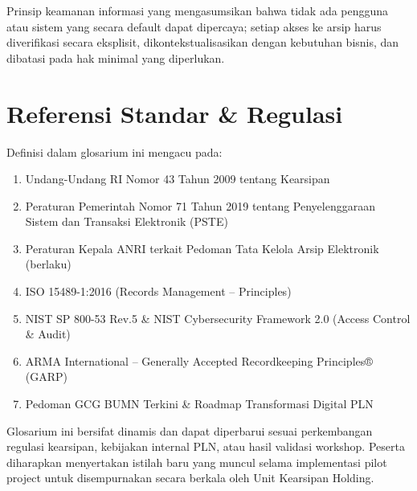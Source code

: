 \documentclass[12pt,a4paper]{report}
\begin{document}
\begin{description}[leftmargin=!, labelwidth=\widthof{\textbf{Penanganan Pengecualian}}, labelsep=1em, itemsep=8pt]
\item[\textbf{Zero Trust Architecture (dalam Konteks Kearsipan)}] Prinsip keamanan informasi yang mengasumsikan bahwa tidak ada pengguna atau sistem yang secara default dapat dipercaya; setiap akses ke arsip harus diverifikasi secara eksplisit, dikontekstualisasikan dengan kebutuhan bisnis, dan dibatasi pada hak minimal yang diperlukan.

\end{description}

\newpage
\chapter*{Referensi Standar \& Regulasi}
Definisi dalam glosarium ini mengacu pada:
\begin{enumerate}[leftmargin=*, nosep]
    \item Undang-Undang RI Nomor 43 Tahun 2009 tentang Kearsipan
    \item Peraturan Pemerintah Nomor 71 Tahun 2019 tentang Penyelenggaraan Sistem dan Transaksi Elektronik (PSTE)
    \item Peraturan Kepala ANRI terkait Pedoman Tata Kelola Arsip Elektronik (berlaku)
    \item ISO 15489-1:2016 (Records Management – Principles)
    \item NIST SP 800-53 Rev.5 \& NIST Cybersecurity Framework 2.0 (Access Control \& Audit)
    \item ARMA International – Generally Accepted Recordkeeping Principles® (GARP)
    \item Pedoman GCG BUMN Terkini \& Roadmap Transformasi Digital PLN
\end{enumerate}

\begin{plnbox}
Glosarium ini bersifat dinamis dan dapat diperbarui sesuai perkembangan regulasi kearsipan, kebijakan internal PLN, atau hasil validasi workshop. Peserta diharapkan menyertakan istilah baru yang muncul selama implementasi pilot project untuk disempurnakan secara berkala oleh Unit Kearsipan Holding.
\end{plnbox}
\end{document}

